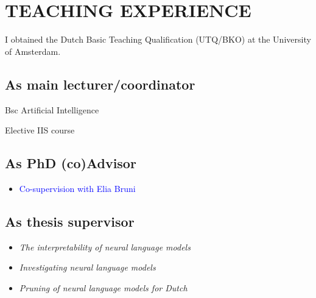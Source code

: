 \section{TEACHING EXPERIENCE}

I obtained the Dutch Basic Teaching Qualification (UTQ/BKO) at the University of Amsterdam.\\

\subsection{As main lecturer/coordinator}
{
{Bsc Artificial Intelligence}

{
{Elective IIS course}

\subsection{As PhD (co)Advisor}
{
{\begin{itemize}
  \item[] \textcolor{blue}{\normalfont Co-supervision with Elia Bruni\vspace{1mm}}
\end{itemize}
}}

\subsection{As thesis supervisor}
{
{\begin{itemize}
  \item[] \textit{The interpretability of neural language models}
\end{itemize}
}}

{
{\begin{itemize}
  \item[] \textit{Investigating neural language models}
\end{itemize}
}}

{
{\begin{itemize}
  \item[] \textit{Pruning of neural language models for Dutch}
\end{itemize}
}}

}}
